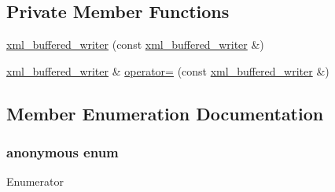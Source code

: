 \subsection*{Private Member Functions}
\begin{DoxyCompactItemize}
\item 
\hyperlink{classxml__buffered__writer_a6ab927cae021733a4b2e9e7cbbb79c13}{xml\-\_\-buffered\-\_\-writer} (const \hyperlink{classxml__buffered__writer}{xml\-\_\-buffered\-\_\-writer} \&)
\item 
\hyperlink{classxml__buffered__writer}{xml\-\_\-buffered\-\_\-writer} \& \hyperlink{classxml__buffered__writer_a0aab8cdf0db6269840a0b16319bdb985}{operator=} (const \hyperlink{classxml__buffered__writer}{xml\-\_\-buffered\-\_\-writer} \&)
\end{DoxyCompactItemize}


\subsection{Member Enumeration Documentation}
\hypertarget{classxml__buffered__writer_a684aec07739ea6e60d47440eee97b4f6}{\subsubsection[{anonymous enum}]{\setlength{\rightskip}{0pt plus 5cm}anonymous enum}}\label{classxml__buffered__writer_a684aec07739ea6e60d47440eee97b4f6}
\begin{Desc}
\item[Enumerator]\par
\begin{description}
\item[{\em 
\hypertarget{classxml__buffered__writer_a684aec07739ea6e60d47440eee97b4f6a9021e7b22ef17fba93b80380f0ffbbc8}{bufcapacitybytes}\label{classxml__buffered__writer_a684aec07739ea6e60d47440eee97b4f6a9021e7b22ef17fba93b80380f0ffbbc8}
}]\item[{\em 
\hypertarget{classxml__buffered__writer_a684aec07739ea6e60d47440eee97b4f6ab8b49b73105796783607f1f1ddd382cd}{bufcapacity}\label{classxml__buffered__writer_a684aec07739ea6e60d47440eee97b4f6ab8b49b73105796783607f1f1ddd382cd}
}]\end{description}
\end{Desc}


